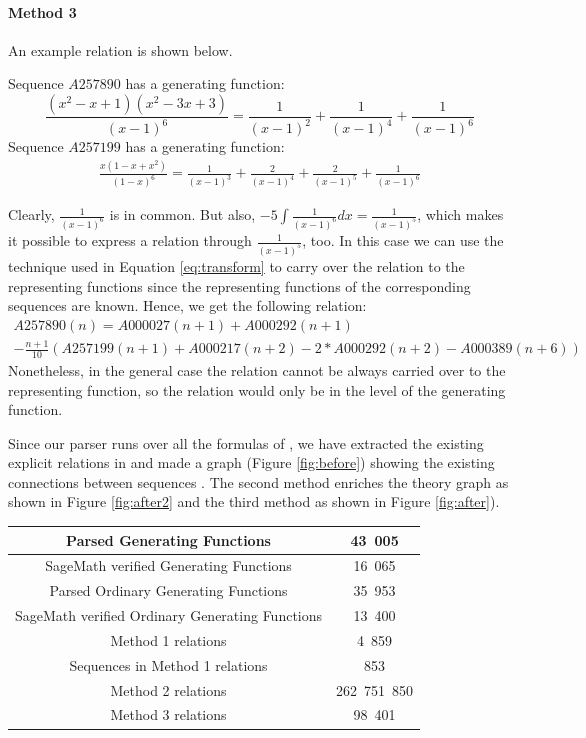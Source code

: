 \paragraph{Method 3} An example relation is shown below.

Sequence $A257890$ has a generating function:
\begin{equation}
\frac{(x^2-x+1)(x^2-3x+3)}{(x-1)^6} = \frac{1}{(x - 1)^2} + \frac{1}{(x - 1)^4} + \frac{1}{(x - 1)^6}
\end{equation}
Sequence $A257199$ has a generating function:
\begin{align}
\frac{x(1 - x + x^2)}{(1 - x)^6} = \frac{1}{(x - 1)^3} + \frac{2}{(x - 1)^4} + \frac{2}{(x - 1)^5} + \frac{1}{(x - 1)
^6}
\end{align}

Clearly, $\frac{1}{(x-1)^6}$ is in common. But also, $-5\int \frac{1}{(x-1)^6} dx = \frac{1}{(x-1)^5}$, which makes
it possible to express a relation through $\frac{1}{(x-1)^5}$, too. In this case we can use the technique used in
Equation \ref{eq:transform} to carry over the relation to the representing functions since the representing functions
 of the corresponding sequences are known. Hence, we get the following relation:
\begin{multline}
A257890(n) = A000027(n+1) + A000292(n+1) \\
- \frac{n+1}{10}(A257199(n+1)
 + A000217(n+2) - 2*A000292(n+2) - A000389(n+6))
\end{multline}
Nonetheless, in the general case the relation cannot be always carried over to the representing function, so the
relation would only be in the level of the generating function.

Since our parser runs over all the formulas of \oeis, we have extracted the existing explicit relations in \oeis and
made a graph (Figure \ref{fig:before}) showing the existing connections between sequences .
The second method enriches the theory graph as shown in Figure \ref{fig:after2} and the third method as shown in
Figure \ref{fig:after}).

\begin{center}
 \begin{tabular}{||c | c||}
 \hline
 Parsed Generating Functions & 43\ 005 \\
 \hline
 SageMath verified Generating Functions & 16\ 065 \\
 \hline
 Parsed Ordinary Generating Functions &  35\ 953 \\
 \hline
 SageMath verified Ordinary Generating Functions & 13\ 400 \\
 \hline
 Method 1 relations & 4\ 859 \\
 \hline
 Sequences in Method 1 relations & 853 \\
 \hline
 Method 2 relations & 262\ 751\ 850\\
 \hline
 Method 3 relations & 98\ 401 \\
 \hline
\end{tabular}
\end{center}

